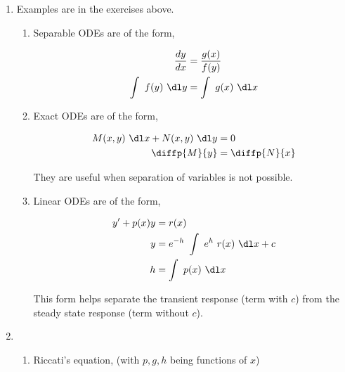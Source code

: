 \begin{enumerate}
    \item Examples are in the exercises above.
          \begin{enumerate}
              \item Separable ODEs are of the form,

                    \begin{align}
                        \frac{dy}{dx}     & = \frac{g(x)}{f(y)} \\
                        \int\ f(y)\ \dl y & = \int\ g(x)\ \dl x
                    \end{align}

              \item Exact ODEs are of the form,

                    \begin{align}
                        M(x, y)\ \dl x + N(x, y)\ \dl y & = 0            \\
                        \diffp{M}{y}                    & = \diffp{N}{x}
                    \end{align}

                    They are useful when separation of variables is not possible.
              \item Linear ODEs are of the form,

                    \begin{align}
                        y' + p(x)y & = r(x)                                 \\
                        y          & = e^{-h}\ \int\ e^{h}\ r(x)\ \dl x + c \\
                        h          & = \int\ p(x)\ \dl x
                    \end{align}

                    This form helps separate the transient response (term with $ c $) from
                    the steady state response (term without $ c $).
          \end{enumerate}

    \item
          \begin{enumerate}
              \item Riccati's equation, (with $ p, g, h $ being functions of $ x $)


\end{enumerate}
\end{enumerate}
